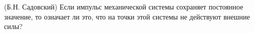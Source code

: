 (Б.Н. Садовский)
Если импульс механической системы сохраняет постоянное значение, то
означает ли это, что на точки этой системы не действуют внешние силы?
